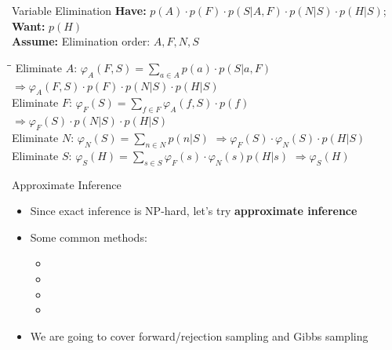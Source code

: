 \begin{frame}{Variable Elimination}{}
	\textbf{Have:} $p(A) \cdot p(F) \cdot p(S \vert A, F) \cdot p(N \vert S) \cdot p(H \vert S)$; \textbf{Want:} $p(H)$ \\
	\textbf{Assume:} Elimination order: $A, F, N, S$
	
	{\footnotesize
	\begin{tabbing}
		\hspace*{3cm}\=\hspace{6cm}\=\kill
		Eliminate $A$:													\>
		$\varphi_A(F, S) = \sum_{a \in A} p(a) \cdot p(S \vert a, F)$ 					\>
		$\Rightarrow \varphi_A(F, S) \cdot p(F) \cdot p(N \vert S) \cdot p(H \vert S) $
		\\[1mm]
		Eliminate $F$:													\>
		$\varphi_F(S) = \sum_{f \in F} \varphi_A(f, S) \cdot p(f)$					\>
		$\Rightarrow \varphi_F(S) \cdot p(N \vert S) \cdot p(H \vert S)$
		\\[1mm]
		Eliminate $N$:													\>
		$\varphi_N(S) = \sum_{n \in N} p(n \vert S)$				 				\>
		$\Rightarrow \varphi_F(S) \cdot \varphi_N(S) \cdot p(H \vert S)$
		\\[1mm]
		Eliminate $S$:													\>
		$\varphi_S(H) = \sum_{s \in S} \varphi_F(s) \cdot \varphi_N(s) p(H \vert s)$		\>
		$\Rightarrow \boxed{\varphi_S(H)}$
	\end{tabbing}}
	
	\begin{boxBlueNoFrame}
		\footnotesize
	\end{boxBlueNoFrame}
\end{frame}


\begin{frame}[plain]{}{}
	
\end{frame}


\begin{frame}{Approximate Inference}{}
	\begin{itemize}
		\item Since exact inference is NP-hard, let's try \textbf{approximate inference}
		\item Some common methods:
		\begin{itemize}
			\item {}
			\item {}
			\item {}
			\item {}
		\end{itemize}
		\item We are going to cover forward/rejection sampling and Gibbs sampling
	\end{itemize}
\end{frame}


